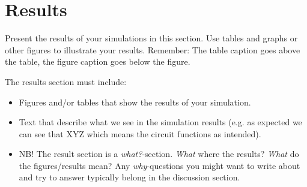 \section{Results}
\label{sec:results}

Present the results of your simulations in this section. Use tables and graphs or other figures to illustrate your results. Remember: The table caption goes above the table, the figure caption goes below the figure.

The results section must include:
\begin{itemize}
    \item Figures and/or tables that show the results of your simulation.
    \item Text that describe what we see in the simulation results (e.g. as expected we can see that XYZ which means the circuit functions as intended).
    \item NB! The result section is a \textit{what?}-section. \textit{What} where the results? \textit{What} do the figures/results mean? Any \textit{why}-questions you might want to write about and try to answer typically belong in the discussion section.
\end{itemize}